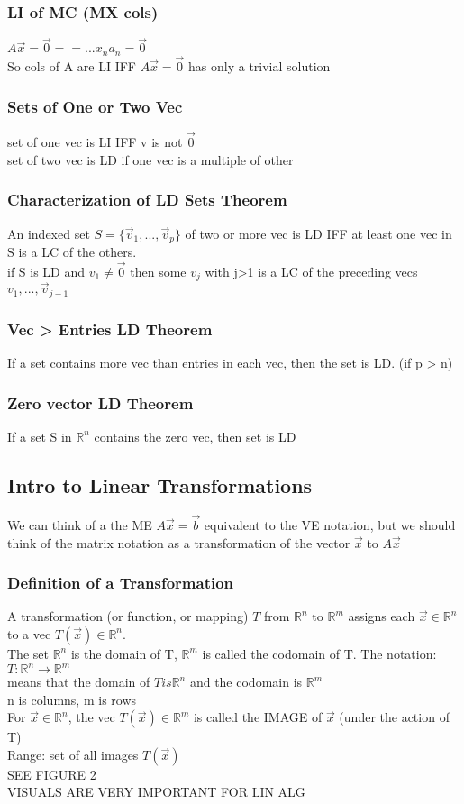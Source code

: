 \documentclass[12pt]{article}
\newcommand{\R}{\mathbb{R}}
\begin{document}
    \subsubsection{LI of MC (MX cols)}
        $ A\vec x= \vec 0 == ...x_{n}a_{n} = \vec 0 $ \\
        So cols of A are LI IFF $ A\vec x= \vec 0 $ has only a trivial solution
    \subsubsection{Sets of One or Two Vec}
        set of one vec is LI IFF v is not $ \vec 0 $ \\
        set of two vec is LD if one vec is a multiple of other 
    \subsubsection{Characterization of LD Sets Theorem}
    An indexed set $ S = \{\vec v_{1},...,\vec v_{p}\} $  of two or more
    vec is LD IFF at least one vec in S is a LC of the others. \\
    if S is LD and $ v_{1}\ne \vec 0 $  then some $ v_{j} $ with j>1
    is a LC of the preceding vecs $ v_{1},...,\vec v_{j-1} $ 
    \subsubsection{Vec > Entries LD Theorem}
        If a set contains more vec than entries in each vec, then
        the set is LD. (if p > n)
    \subsubsection{Zero vector LD Theorem}
        If a set S in $ \R^{n} $  contains the zero vec, then set is LD 
\subsection{Intro to Linear Transformations}
    We can think of a the ME $ A\vec x = \vec b $  equivalent to 
    the VE notation, but we should think of the matrix notation as
    a transformation of the vector $\vec x$  to $ A\vec x $ 
    \subsubsection{Definition of a Transformation}
        A transformation (or function, or mapping) $ T $  from 
        $ \R^n $  to $ \R^m $ assigns each $ \vec x \in\R^n$ to a vec
        $ T(\vec x)\in\R^n $. \\
        The set  $\R^n$  is the domain of T, $\R^m$  is called the codomain of
        T. The notation: $T: \R^n \rightarrow \R^m$  \\
        means that the domain of $T is \R^n$  and the codomain is $\R^m$  \\
        n is columns, m is rows \\
        For $\vec x\in\R^n$, the vec $T(\vec x)\in\R^m$  is called 
        the IMAGE of $\vec x$  (under the action of T) \\
        Range: set of all images $T(\vec x)$ \\
        SEE FIGURE 2 \\
        VISUALS ARE VERY IMPORTANT FOR LIN ALG 
\end{document}
